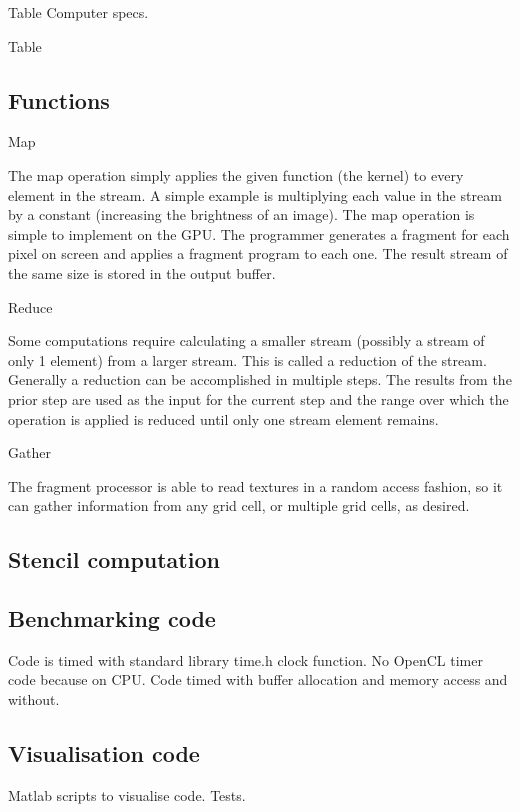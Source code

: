 Table Computer specs.


Table

\subsection{Functions}
Map

The map operation simply applies the given function (the kernel) to every element in the stream. A simple example is multiplying each value in the stream by a constant (increasing the brightness of an image). The map operation is simple to implement on the GPU. The programmer generates a fragment for each pixel on screen and applies a fragment program to each one. The result stream of the same size is stored in the output buffer.


Reduce

Some computations require calculating a smaller stream (possibly a stream of only 1 element) from a larger stream. This is called a reduction of the stream. Generally a reduction can be accomplished in multiple steps. The results from the prior step are used as the input for the current step and the range over which the operation is applied is reduced until only one stream element remains.

Gather

The fragment processor is able to read textures in a random access fashion, so it can gather information from any grid cell, or multiple grid cells, as desired.

\subsection{Stencil computation}


\subsection{Benchmarking code}
Code is timed with standard library time.h clock function.
No OpenCL timer code because on CPU. Code timed with buffer allocation and memory access and without.

\subsection{Visualisation code}
Matlab scripts to visualise code. Tests.

